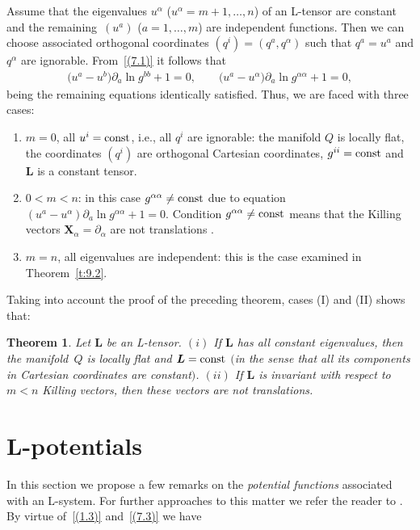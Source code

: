 \documentclass[pdftex]{sigma}
\def\bs{\boldsymbol}
\numberwithin{equation}{section}
\newtheorem{Theorem}{Theorem}[section]
 { \theoremstyle{definition}
\newtheorem{Notation}[Theorem]{Notation}
\newtheorem{Example}[Theorem]{Example}
\newtheorem{Remark}[Theorem]{Remark}
\newtheorem{Remarks}[Theorem]{Remarks}
 }
\begin{document}
Assume that the eigenvalues $u^\alpha$ ($u^\alpha=m+1,\ldots,n$) of an L-tensor are constant and the remaining~$(u^a)$ ($a=1,\ldots,m$) are independent functions. Then we can choose associated orthogonal coordinates $(q^i)=(q^a,q^\alpha)$ such that $q^a=u^a$ and $q^\alpha$ are ignorable. From~\eqref{(7.1)} it follows that
\begin{gather*}
\big(u^a-u^b\big) \partial_a\ln g^{bb}+1=0, \qquad
\big(u^a-u^\alpha\big) \partial_a\ln g^{\alpha\alpha}+1=0,
\end{gather*}
being the remaining equations identically satisf\/ied. Thus, we are faced with three cases:
\begin{enumerate}\itemsep=0pt
\item[(I)] $m=0$, all $u^i={\rm const}$, i.e., all $q^i$ are ignorable: the manifold $Q$ is locally f\/lat, the coordinates $(q^i)$
are orthogonal Cartesian coordinates, $g^{ii}={\rm const}$ and $\bs L$ is a constant tensor.

\item[(II)] $0<m<n$: in this case $g^{\alpha\alpha}\neq{\rm const}$ due to equation $(u^a-u^\alpha)\partial_a\ln g^{\alpha\alpha}+1=0$.
Condition $g^{\alpha\alpha}\neq{\rm const}$ means that the Killing vectors $\bs X_\alpha=\partial_\alpha$ are  not translations \cite[Section~52]{Eisenhart-1933}.

\item[(III)] $m=n$, all eigenvalues are independent: this is the case examined in Theorem~\ref{t:9.2}.
\end{enumerate}

Taking into account the proof of the preceding theorem, cases (I) and (II) shows that:

\begin{Theorem}\label{t:9.3}
Let $\bs L$ be an L-tensor.
$(i)$ If $\bs L$ has all constant eigenvalues, then the mani\-fold~$Q$ is locally flat and $\bs L={\rm const}$ $($in the sense that all its components in Cartesian coordinates are constant$)$.
$(ii)$ If $\bs L$ is invariant with respect to  $m<n$ Killing vectors, then these vectors are not translations.
\end{Theorem}


\section{L-potentials}\label{section10}

In this section we propose a few remarks on the {\it potential functions} associated with an L-system. For further approaches to this matter we refer the reader to \cite{Blaszak-Ma-2003, Ibort-Magri-Marmo-2000}. By virtue of~\eqref{(1.3)} and~\eqref{(7.3)} we have
\end{document}
